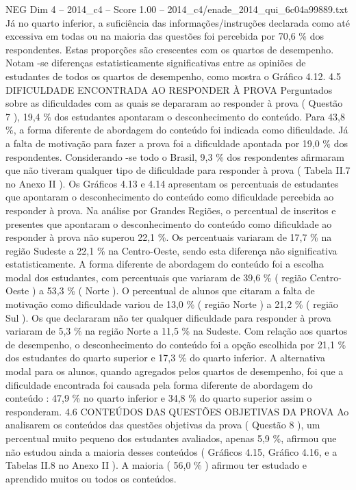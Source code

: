 \begin{textsample}{NEG Dim 4 – 2014\_c4 – Score 1.00 – 2014\_c4/enade\_2014\_qui\_6c04a99889.txt}
Já no quarto inferior, a suficiência das informações/instruções declarada como até excessiva em todas ou na maioria das questões foi percebida por 70,6 \% dos respondentes.
Estas proporções são crescentes com os quartos de desempenho.
Notam -se diferenças estatisticamente significativas entre as opiniões de estudantes de todos os quartos de desempenho, como mostra o Gráfico 4.12. 4.5 DIFICULDADE ENCONTRADA AO RESPONDER À PROVA Perguntados sobre as dificuldades com as quais se depararam ao responder à prova ( Questão 7 ), 19,4 \% dos estudantes apontaram o desconhecimento do conteúdo.
Para 43,8 \%, a forma diferente de abordagem do conteúdo foi indicada como dificuldade.
Já a falta de motivação para fazer a prova foi a dificuldade apontada por 19,0 \% dos respondentes.
Considerando -se todo o Brasil, 9,3 \% dos respondentes afirmaram que não tiveram qualquer tipo de dificuldade para responder à prova ( Tabela II.7 no Anexo II ).
Os Gráficos 4.13 e 4.14 apresentam os percentuais de estudantes que apontaram o desconhecimento do conteúdo como dificuldade percebida ao responder à prova.
Na análise por Grandes Regiões, o percentual de inscritos e presentes que apontaram o desconhecimento do conteúdo como dificuldade ao responder à prova não superou 22,1 \%.
Os percentuais variaram de 17,7 \% na região Sudeste a 22,1 \% na Centro-Oeste, sendo esta diferença não significativa estatisticamente.
A forma diferente de abordagem do conteúdo foi a escolha modal dos estudantes, com percentuais que variaram de 39,6 \% ( região Centro-Oeste ) a 53,3 \% ( Norte ).
O percentual de alunos que citaram a falta de motivação como dificuldade variou de 13,0 \% ( região Norte ) a 21,2 \% ( região Sul ).
Os que declararam não ter qualquer dificuldade para responder à prova variaram de 5,3 \% na região Norte a 11,5 \% na Sudeste.
Com relação aos quartos de desempenho, o desconhecimento do conteúdo foi a opção escolhida por 21,1 \% dos estudantes do quarto superior e 17,3 \% do quarto inferior.
A alternativa modal para os alunos, quando agregados pelos quartos de desempenho, foi que a dificuldade encontrada foi causada pela forma diferente de abordagem do conteúdo : 47,9 \% no quarto inferior e 34,8 \% do quarto superior assim o responderam. 4.6 CONTEÚDOS DAS QUESTÕES OBJETIVAS DA PROVA Ao analisarem os conteúdos das questões objetivas da prova ( Questão 8 ), um percentual muito pequeno dos estudantes avaliados, apenas 5,9 \%, afirmou que não estudou ainda a maioria desses conteúdos ( Gráficos 4.15, Gráfico 4.16, e a Tabelas II.8 no Anexo II ).
A maioria ( 56,0 \% ) afirmou ter estudado e aprendido muitos ou todos os conteúdos.

\end{textsample}
